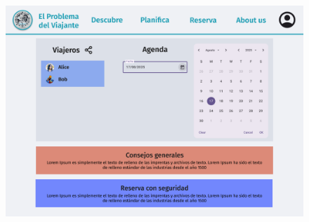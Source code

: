 \documentclass[11pt, a4paper]{book}
\begin{document}
	\begin{figure} [H]
		\centering
		\begin{minipage}[c]{0.45\textwidth}
			\centering
			\includegraphics[width=\textwidth]{mockup-planifica.png}
		\end{minipage}
		\hspace{0.04\textwidth}
		\begin{minipage}[c]{0.45\textwidth}
			\centering

\end{minipage}
\end{figure}
\end{document}

